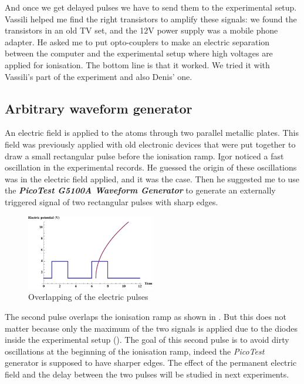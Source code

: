 \documentclass[twoside, open=right
]{scrreprt}
\begin{document}
\par And once we get delayed pulses we have to send them to the experimental setup. Vassili helped me find the right transistors to amplify these signals: we found the transistors in an old TV set, and the 12V power supply was a mobile phone adapter. He asked me to put opto-couplers to make an electric separation between the computer and the experimental setup where high voltages are applied for ionisation. The bottom line is that it worked. We tried it with Vassili's part of the experiment and also Denis' one.

\subsection{Arbitrary waveform generator}

\par An electric field is applied to the atoms through two parallel metallic plates. This field was previously applied with old electronic devices that were put together to draw a small rectangular pulse before the ionisation ramp. Igor noticed a fast oscillation in the experimental records. He guessed the origin of these oscillations was in the electric field applied, and it was the case. Then he suggested me to use the \emph{\textbf{PicoTest  G5100A Waveform Generator}} to generate an externally triggered signal of two rectangular pulses with sharp edges.

\begin{figure}
  \vspace{-10pt}
  \centering
  \includegraphics[width=0.5\textwidth]{overlap.pdf}
  \caption{\label{overlap}Overlapping of the electric pulses}
  \vspace{-20pt}
\end{figure}

\par The second pulse overlaps the ionisation ramp as shown in . But this does not matter because only the maximum of the two signals is applied due to the diodes inside the experimental setup (). The goal of this second pulse is to avoid dirty oscillations at the beginning of the ionisation ramp, indeed the \emph{PicoTest} generator is supposed to have sharper edges. The effect of the permanent electric field and the delay between the two pulses will be studied in next experiments.
\end{document}

